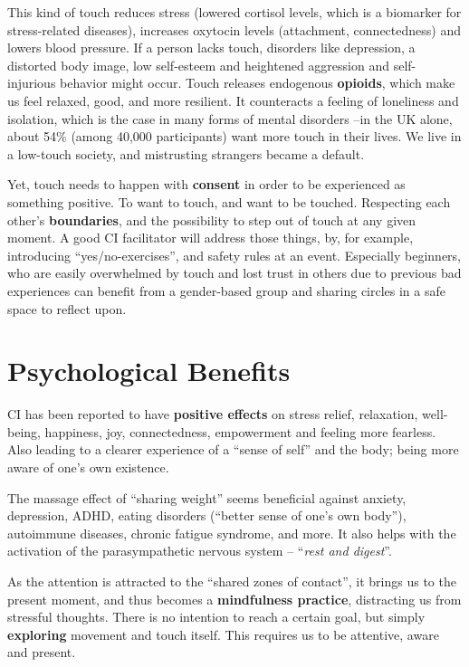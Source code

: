 This kind of touch reduces stress (lowered cortisol levels, which is a biomarker for stress-related diseases), increases oxytocin levels (attachment, connectedness) and lowers blood pressure.
If a person lacks touch, disorders like depression, a distorted body image, low self-esteem and heightened aggression and self-injurious behavior might occur.
Touch releases endogenous \textbf{opioids}, which make us feel relaxed, good, and more resilient.
It counteracts a feeling of loneliness and isolation, which is the case in many forms of mental disorders --in the UK alone, about 54\% (among 40,000 participants) want more touch in their lives.
We live in a low-touch society, and mistrusting strangers became a default.

Yet, touch needs to happen with \textbf{consent} in order to be experienced as something positive.
To want to touch, and want to be touched.
Respecting each other's \textbf{boundaries}, and the possibility to step out of touch at any given moment.
A good CI facilitator will address those things, by, for example, introducing ``yes/no-exercises'', and safety rules at an event.
Especially beginners, who are easily overwhelmed by touch and lost trust in others due to previous bad experiences can benefit from a gender-based group and sharing circles in a safe space to reflect upon.

\section{Psychological Benefits}\label{sec:psychological-health-benefits}

CI has been reported to have \textbf{positive effects} on stress relief, relaxation, well-being, happiness, joy, connectedness, empowerment and feeling more fearless.
Also leading to a clearer experience of a ``sense of self'' and the body; being more aware of one's own existence.

The massage effect of ``sharing weight'' seems beneficial against anxiety, depression, ADHD, eating disorders (``better sense of one's own body''), autoimmune diseases, chronic fatigue syndrome, and more.
It also helps with the activation of the parasympathetic nervous system -- ``\textit{rest and digest}''.

As the attention is attracted to the ``shared zones of contact'', it brings us to the present moment, and thus becomes a \textbf{mindfulness practice}, distracting us from stressful thoughts.
There is no intention to reach a certain goal, but simply \textbf{exploring} movement and touch itself.
This requires us to be attentive, aware and present.

